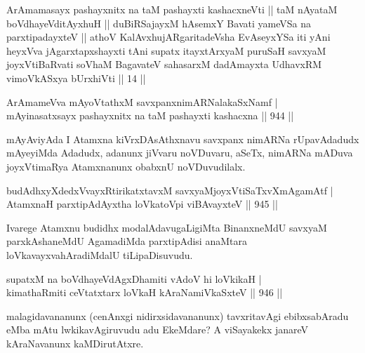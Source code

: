 \begin{shl}
ArAmamasayx pashayxnitx na taM pashayxti kashacxneVti || taM nAyataM boVdhayeVditAyxhuH || duBiRSajayxM hAsemxY Bavati yameVSa na parxtipadayxteV || athoV KalAvxhujARgaritadeVsha EvAseyxYSa iti yAni heyxVva jAgarxtapxshayxti tAni supatx itayxtArxyaM puruSaH savxyaM joyxVtiBaRvati soV\s haM BagavateV sahasarxM dadAmayxta UdhavxRM vimoVkASxya bUrxhiVti || 14 ||
\end{shl}


\begin{shl}
ArAmameVva mAyoVtathxM savxpanxnimARNalakaSxNamf | \\
mAyinasatxsayx pashayxnitx na taM pashayxti kashacxna \hfill||  944 ||  
\end{shl}

\begin{artha}
mAyAviyAda I Atamxna kiVrxDAsAthxnavu savxpanx nimARNa rUpavAdadudx mAyeyiMda Adadudx, adanunx jiVvaru noVDuvaru, aSeTx, nimARNa mADuva joyxVtimaRya Atamxnanunx obabxnU noVDuvudilalx.
\end{artha}

\begin{shl}
budAdhxyXdedxVvayxRtirikatxtavxM savxyaMjoyxVtiSaTxvXmAgamAtf | \\
AtamxnaH parxtipAdAyxtha loVkatoV\s pi viBAvayxteV \hfill||  945 ||  
\end{shl}

\begin{artha}
Ivarege Atamxnu budidhx modalAdavugaLigiMta BinanxneMdU savxyaM parxkAshaneMdU AgamadiMda parxtipAdisi anaMtara loVkavayxvahAradiMdalU tiLipaDisuvudu.
\end{artha}


\begin{shl}
supatxM na boVdhayeVdAgxDhamiti vAdoV hi loVkikaH | \\
kimathaRmiti ceVtatxtarx loVkaH kAraNamiVkaSxteV \hfill||  946 ||  
\end{shl}

\begin{artha}
malagidavananunx (cenAnxgi nidirxsidavananunx) tavxritavAgi ebibxsabAradu eMba mAtu lwkikavAgiruvudu adu EkeMdare? A viSayakekx janareV kAraNavanunx kaMDirutAtxre.
\end{artha}


